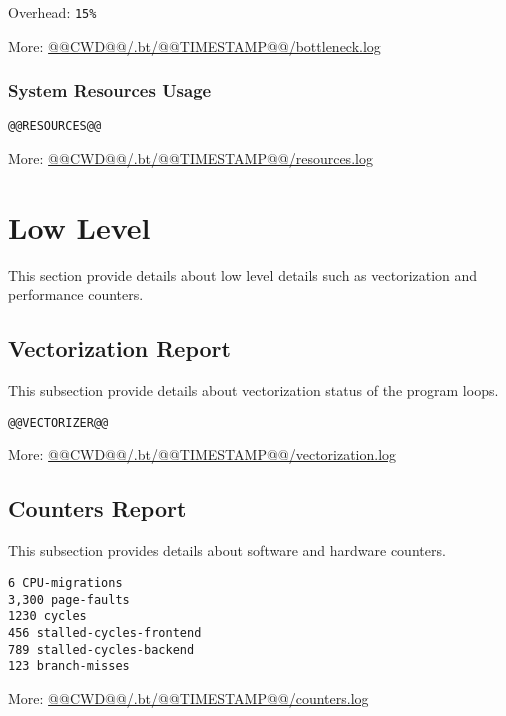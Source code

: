 \documentclass[a4paper]{article}
\begin{document}
Overhead: {\tt 15\%}

More: \href{@@CWD@@/.bt/@@TIMESTAMP@@/scalability.log}{@@CWD@@/.bt/@@TIMESTAMP@@/bottleneck.log}

\subsubsection{System Resources Usage}

\begin{verbatim}
@@RESOURCES@@
\end{verbatim}

More: \href{@@CWD@@/.bt/@@TIMESTAMP@@/scalability.log}{@@CWD@@/.bt/@@TIMESTAMP@@/resources.log}

\section{Low Level}

This section provide details about low level details such as vectorization and performance counters.

\subsection{Vectorization Report}

This subsection provide details about vectorization status of the program loops.

\begin{verbatim}
@@VECTORIZER@@
\end{verbatim}

More: \href{@@CWD@@/.bt/@@TIMESTAMP@@/scalability.log}{@@CWD@@/.bt/@@TIMESTAMP@@/vectorization.log}

\subsection{Counters Report}

This subsection provides details about software and hardware counters.

\begin{verbatim}
6 CPU-migrations
3,300 page-faults
1230 cycles
456 stalled-cycles-frontend
789 stalled-cycles-backend
123 branch-misses
\end{verbatim}

More: \href{@@CWD@@/.bt/@@TIMESTAMP@@/scalability.log}{@@CWD@@/.bt/@@TIMESTAMP@@/counters.log}
\end{document}
